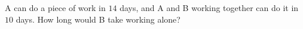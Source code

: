 A can do a piece of work in $14$ days, and A and B working together can do it in $10$ days. How long would B take working alone?
